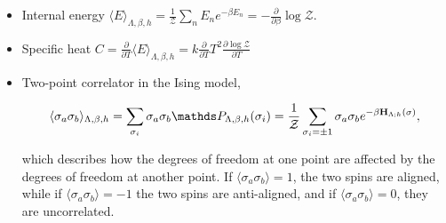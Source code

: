 \documentclass{homework}
\begin{document}
\begin{itemize}
    \item Internal energy $\langle E\rangle_{\Lambda, \beta, h} = \frac{1}{\mathcal{Z}} \sum_{n} E_n e^{-\beta E_n} = - \frac{\partial}{\partial \beta} \log \mathcal{Z}$. \\
    \item Specific heat $C = \frac{\partial}{\partial T} \langle E\rangle_{\Lambda, \beta, h} = k \frac{\partial}{\partial T} T^2 \frac{\partial \log \mathcal{Z}}{\partial T}$ \\
    \item Two-point correlator in the Ising model, 
    
    $$
    \langle \sigma_a \sigma_b \rangle_{\Lambda, \beta, h} = \sum_{\sigma_i} \sigma_a \sigma_b \prob_{\Lambda, \beta, h}({\sigma_i}) = \frac{1}{\mathcal{Z}} \sum_{\sigma_i = \pm 1} \sigma_a \sigma_b e^{-\beta {\bf H}_{\Lambda; h}(\sigma)},
    $$
    
    which describes how the degrees of freedom at one point are affected by the degrees of freedom at another point. If $ \langle \sigma_a \sigma_b \rangle = 1$, the two spins are aligned, while if $ \langle \sigma_a \sigma_b \rangle = -1$ the two spins are anti-aligned, and if $ \langle \sigma_a \sigma_b \rangle = 0$, they are uncorrelated. 
\end{itemize}



\end{document}
